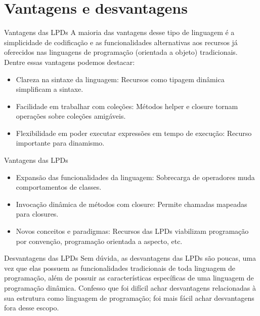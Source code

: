 \documentclass{beamer}
\begin{document}
\section{Vantagens e desvantagens}
\begin{frame}{Vantagens das LPDs}\justifying
	A maioria das vantagens desse tipo de linguagem é a simplicidade de codificação e as funcionalidades alternativas aos recursos já oferecidos nas linguagens de programação (orientada a objeto) tradicionais. Dentre essas vantagens podemos destacar:

	\begin{itemize}
		\item Clareza na sintaxe da linguagem: Recursos como tipagem dinâmica simplificam a sintaxe.
		\item Facilidade em trabalhar com coleções: Métodos helper e closure tornam operações sobre coleções amigáveis.
		\item Flexibilidade em poder executar expressões em tempo de execução: Recurso importante para dinamismo.

	\end{itemize}
\end{frame}
\begin{frame}{Vantagens das LPDs}\justifying


	\begin{itemize}
		\item Expansão das funcionalidades da linguagem: Sobrecarga de operadores muda comportamentos de classes.
		\item Invocação dinâmica de métodos com closure: Permite chamadas mapeadas para closures.
		\item Novos conceitos e paradigmas: Recursos das LPDs viabilizam programação por convenção, programação orientada a aspecto, etc.
	\end{itemize}
\end{frame}

\begin{frame}{Desvantagens das LPDs}\justifying
	Sem dúvida, as desvantagens das LPDs são poucas, uma vez que elas possuem as funcionalidades tradicionais de toda linguagem de programação, além de possuir as características específicas de uma linguagem de programação dinâmica. Confesso que foi difícil achar desvantagens relacionadas à sua estrutura como linguagem de programação; foi mais fácil achar desvantagens fora desse escopo.

\end{frame}
\end{document}
